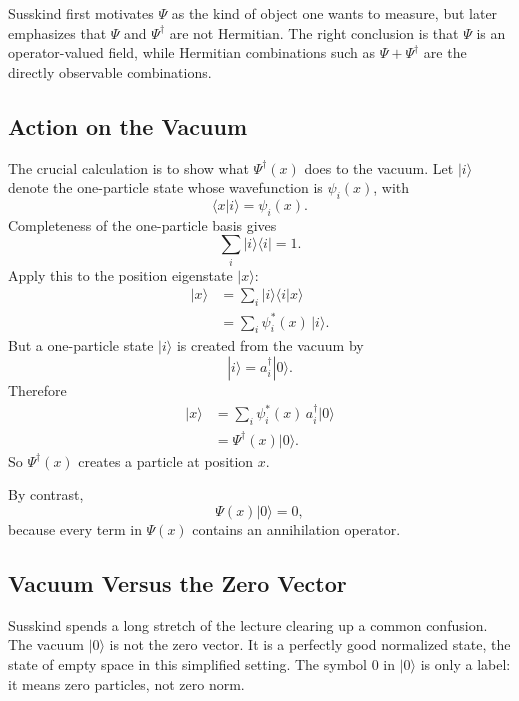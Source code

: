 \begin{remark}
Susskind first motivates \(\Psi\) as the kind of object one wants to measure, but later emphasizes that \(\Psi\) and \(\Psi^\dagger\) are not Hermitian. The right conclusion is that \(\Psi\) is an operator-valued field, while Hermitian combinations such as \(\Psi+\Psi^\dagger\) are the directly observable combinations.
\end{remark}

\subsection{Action on the Vacuum}

The crucial calculation is to show what \(\Psi^\dagger(x)\) does to the vacuum. Let \(|i\rangle\) denote the one-particle state whose wavefunction is \(\psi_i(x)\), with
\begin{equation}
\langle x|i\rangle = \psi_i(x).
\end{equation}
Completeness of the one-particle basis gives
\begin{equation}
\sum_i |i\rangle\langle i| = 1.
\end{equation}
Apply this to the position eigenstate \(|x\rangle\):
\begin{align}
|x\rangle
&=
\sum_i |i\rangle\langle i|x\rangle \\
&=
\sum_i \psi_i^*(x)\,|i\rangle.
\end{align}
But a one-particle state \(|i\rangle\) is created from the vacuum by
\begin{equation}
|i\rangle = a_i^\dagger |0\rangle.
\end{equation}
Therefore
\begin{align}
|x\rangle
&=
\sum_i \psi_i^*(x)\,a_i^\dagger |0\rangle \\
&=
\Psi^\dagger(x)|0\rangle.
\end{align}
So \(\Psi^\dagger(x)\) creates a particle at position \(x\).

By contrast,
\begin{equation}
\Psi(x)|0\rangle = 0,
\end{equation}
because every term in \(\Psi(x)\) contains an annihilation operator.

\subsection{Vacuum Versus the Zero Vector}

Susskind spends a long stretch of the lecture clearing up a common confusion. The vacuum \(|0\rangle\) is not the zero vector. It is a perfectly good normalized state, the state of empty space in this simplified setting. The symbol \(0\) in \(|0\rangle\) is only a label: it means zero particles, not zero norm.

